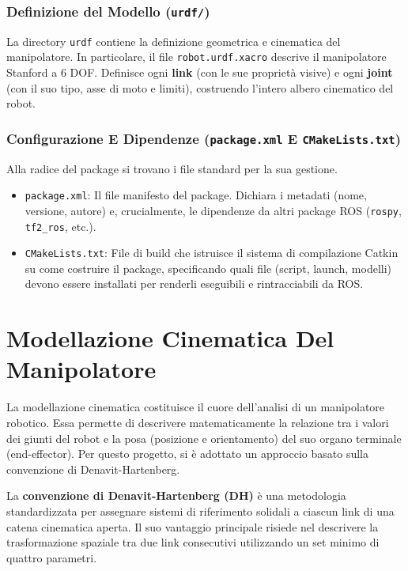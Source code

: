 \documentclass[11pt, a4paper]{report}
\begin{document}
\subsection{Definizione del Modello (\texttt{urdf/})}
La directory \texttt{urdf} contiene la definizione geometrica e cinematica del manipolatore. In particolare, il file \texttt{robot.urdf.xacro} descrive il manipolatore Stanford a 6 DOF. Definisce ogni \textbf{link} (con le sue proprietà visive) e ogni \textbf{joint} (con il suo tipo, asse di moto e limiti), costruendo l'intero albero cinematico del robot.

\subsection{Configurazione E Dipendenze (\texttt{package.xml} E \texttt{CMakeLists.txt})}
Alla radice del package si trovano i file standard per la sua gestione.
\begin{itemize}
    \item \texttt{package.xml}: Il file manifesto del package. Dichiara i metadati (nome, versione, autore) e, crucialmente, le dipendenze da altri package ROS (\texttt{rospy}, \texttt{tf2\_ros}, etc.).
    \item \texttt{CMakeLists.txt}: File di build che istruisce il sistema di compilazione Catkin su come costruire il package, specificando quali file (script, launch, modelli) devono essere installati per renderli eseguibili e rintracciabili da ROS.
\end{itemize}


\chapter{Modellazione Cinematica Del Manipolatore}
\label{chap:modellazione_cinematica}

La modellazione cinematica costituisce il cuore dell'analisi di un manipolatore robotico. Essa permette di descrivere matematicamente la relazione tra i valori dei giunti del robot e la posa (posizione e orientamento) del suo organo terminale (end-effector). Per questo progetto, si è adottato un approccio basato sulla convenzione di Denavit-Hartenberg.

La \textbf{convenzione di Denavit-Hartenberg (DH)} è una metodologia standardizzata per assegnare sistemi di riferimento solidali a ciascun link di una catena cinematica aperta. Il suo vantaggio principale risiede nel descrivere la trasformazione spaziale tra due link consecutivi utilizzando un set minimo di quattro parametri.
\end{document}
